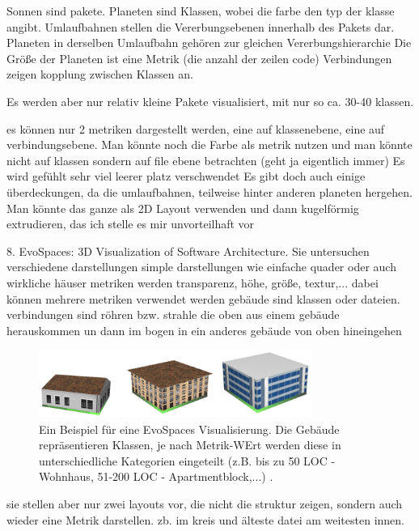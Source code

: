 Sonnen sind pakete. Planeten sind Klassen, wobei die farbe den typ der klasse angibt. 
Umlaufbahnen stellen die Vererbungsebenen innerhalb des Pakets dar. Planeten in derselben Umlaufbahn gehören zur gleichen Vererbungshierarchie
Die Größe der Planeten ist eine Metrik (die anzahl der zeilen code)
Verbindungen zeigen kopplung zwischen Klassen an.

Es werden aber nur relativ kleine Pakete visualisiert, mit nur so ca. 30-40 klassen.

es können nur 2 metriken dargestellt werden, eine auf klassenebene, eine auf verbindungsebene.
Man könnte noch die Farbe als metrik nutzen und man könnte nicht auf klassen sondern auf file ebene betrachten (geht ja eigentlich immer)
Es wird gefühlt sehr viel leerer platz verschwendet
Es gibt doch auch einige überdeckungen, da die umlaufbahnen, teilweise hinter anderen planeten hergehen.
Man könnte das ganze als 2D Layout verwenden und dann kugelförmig extrudieren, das 
ich stelle es mir unvorteilhaft vor

8. EvoSpaces: 3D Visualization of Software Architecture. \cite{EvoSpaces}
Sie untersuchen verschiedene darstellungen 
simple darstellungen wie einfache quader oder auch wirkliche häuser
metriken werden transparenz, höhe, größe, textur,...
dabei können mehrere metriken verwendet werden
gebäude sind klassen oder dateien. verbindungen sind röhren bzw. strahle die oben aus einem gebäude herauskommen un dann im bogen in ein anderes gebäude von oben hineingehen

\begin{figure}
    \centering
    \includegraphics[width=0.8\textwidth]{images/literatur/evoSpaces.png}
    \caption{Ein Beispiel für eine EvoSpaces Visualisierung. Die Gebäude repräsentieren Klassen, je nach Metrik-WErt werden diese in unterschiedliche Kategorien eingeteilt (z.B. bis zu 50 LOC - Wohnhaus, 51-200 LOC - Apartmentblock,...) \cite[3]{EvoSpaces}.}
    \label{fig:evoSpaces}
\end{figure}

sie stellen aber nur zwei layouts vor, die nicht die struktur zeigen, sondern auch wieder eine Metrik darstellen. zb. im kreis und älteste datei am weitesten innen.

